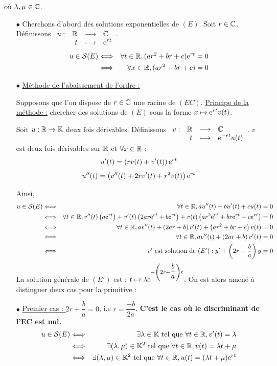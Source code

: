 \documentclass{magnoliaold}
\begin{document}
\begin{preuve}
\begin{francois}
\begin{itemize}
où $\lambda,\mu\in\mathbb{C}$.
\end{itemize}
\end{francois}
\begin{victor}
\begin{itemize}
\item [$\bullet$] Cherchons d'abord des solutions exponentielles de $(E)$. Soit $r\in \mathbb{C}$. Définissons $\begin{array}[t]{lrcl} \displaystyle{u} : & \displaystyle{\mathbb{R}} & \longrightarrow & \displaystyle{\mathbb{C}} \\ & \displaystyle{t} & \longmapsto & \displaystyle{{\rm e}^{rt}} \end{array}$.
\begin{eqnarray*}
u \in \mathcal{S}(E) &\Longleftrightarrow& \forall t\in \mathbb{R}, (ar^2+br+c){\rm e}^{rt}=0\\
&\Longleftrightarrow& \forall x\in \mathbb{R}, (ar^2+br+c)=0
\end{eqnarray*}
\item [$\bullet$] \underline{Méthode de l'abaissement de l'ordre :}

Supposons que l'on dispose de $r\in\mathbb{C}$ une racine de $(EC)$. \underline{Principe de la méthode :} chercher des solutions de $(E)$ sous la forme $x\mapsto {\rm e}^{rt}v(t)$.

Soit $u:\mathbb{R}\to \mathbb{K}$ deux fois dérivables. Définissons $\begin{array}[t]{lrcl} \displaystyle{v} : & \displaystyle{\mathbb{R}} & \longrightarrow & \displaystyle{\mathbb{C}} \\ & \displaystyle{t} & \longmapsto & \displaystyle{{\rm e}^{-rt}u(t)} \end{array}$. $v$ est deux fois dérivables sur $\mathbb{R}$ et $\forall x\in\mathbb{R}$ :
\[u'(t)=\left(rv(t)+v'(t)\right){\rm e}^{rt}\]
\[u''(t)=\left(v''(t)+2rv'(t)+r^2v(t)\right){\rm e}^{rt}\]

Ainsi,
\begin{eqnarray*}
u\in \mathcal{S}(E)&\Longleftrightarrow & \forall t\in \mathbb{R}, au''(t)+bu'(t)+cu(t)=0\\
&\Longleftrightarrow & \forall t\in \mathbb{R}, v''(t)\left(a{\rm e}^{rt}\right)+v'(t)\left(2ar{\rm e}^{rt}+b{\rm e}^{rt}\right)+v(t)\left(ar^2{\rm e}^{rt}+br{\rm e}^{rt}+c{\rm e}^{rt}\right)=0\\
&\Longleftrightarrow & \forall t\in \mathbb{R}, av''(t)+\left(2ar+b\right)v'(t)+\left(ar^2+br+c\right)v(t)=0\\
&\Longleftrightarrow & \forall t\in \mathbb{R}, av''(t)+\left(2ar+b\right)v'(t)=0\\
&\Longleftrightarrow & v' \text{ est solution de } (E') : y'+\left(2r+\dfrac{b}{a}\right)y=0
\end{eqnarray*}
La solution générale de $(E')$ est : $t\mapsto \lambda {\rm e}^{-\left(2r+\dfrac{b}{a}\right)t}$. On est alors amené à distinguer deux cas pour la primitive :

\item [$\bullet$] \underline{Premier cas : } $2r+\dfrac{b}{a}=0$, i.e $r=\dfrac{-b}{2a}$. \textbf{C'est le cas où le discriminant de l'EC est nul.}
\begin{eqnarray*}
u\in \mathcal{S}(E)&\Longleftrightarrow & \exists \lambda\in\mathbb{K} \text{ tel que } \forall t \in \mathbb{R}, v'(t)=\lambda\\
&\Longleftrightarrow & \exists (\lambda,\mu)\in\mathbb{K}^2 \text{ tel que } \forall t \in \mathbb{R}, v(t)=\lambda t+\mu\\
&\Longleftrightarrow & \exists (\lambda,\mu)\in\mathbb{K}^2 \text{ tel que } \forall t \in \mathbb{R}, u(t)=(\lambda t+\mu){\rm e}^{rt}
\end{eqnarray*}


\end{itemize}
\end{victor}
\end{preuve}
\end{document}
